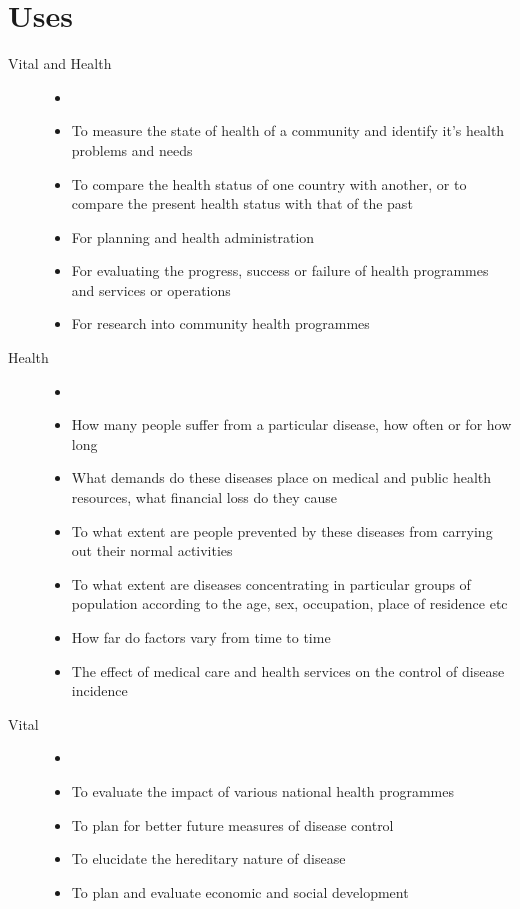 \documentclass[
10pt, %
a4paper, %
]{report}
\begin{document}
\section{Uses}
\begin{description}
\item[Vital and Health]
\begin{itemize}
\item[]
\item To measure the state of health of a community and identify it’s health problems and needs
\item To compare the health status of one country with another, or to compare the present health status with that of the past
\item For planning and health administration
\item For evaluating the progress, success or failure of health programmes and services or operations
\item For research into community health programmes
\end{itemize}
\item[Health]
\begin{itemize}
\item[]
\item How many people suffer from a particular disease, how often or for how long
\item What demands do these diseases place on medical and public health resources, what financial loss do they cause
\item To what extent are people prevented by these diseases from carrying out their normal activities
\item To what extent are diseases concentrating in particular groups of population according to the age, sex, occupation, place of residence etc
\item How far do factors vary from time to time
\item The effect of medical care and health services on the control of disease incidence
\end{itemize}
\item[Vital]
\begin{itemize}
\item[]
\item To evaluate the impact of various national health programmes
\item To plan for better future measures of disease control
\item To elucidate the hereditary nature of disease
\item To plan and evaluate economic and social development

\end{itemize}
\end{description}
\end{document}
